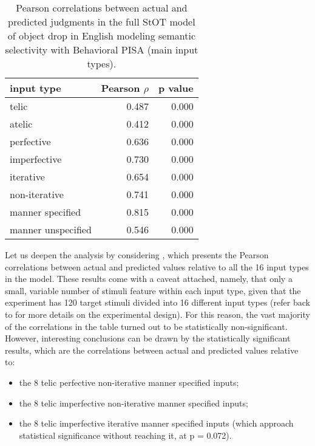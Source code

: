 \begin{table}[htb] %
\caption{Pearson correlations between actual and predicted judgments in the full StOT model of object drop in English modeling semantic selectivity with Behavioral PISA (main input types).}
\begin{tabular}{l|rr}
\textbf{input type} & \textbf{Pearson $\rho$} & \textbf{p value} \\
\hline
telic               & 0.487 & 0.000 \\
atelic              & 0.412 & 0.000 \\
perfective          & 0.636 & 0.000 \\
imperfective        & 0.730 & 0.000 \\
iterative           & 0.654 & 0.000 \\
non-iterative       & 0.741 & 0.000 \\
manner specified    & 0.815 & 0.000 \\
manner unspecified  & 0.546 & 0.000
\end{tabular}
\end{table}

Let us deepen the analysis by considering , which presents the Pearson correlations between actual and predicted values relative to all the 16 input types in the model. These results come with a caveat attached, namely, that only a small, variable number of stimuli feature within each input type, given that the experiment has 120 target stimuli divided into 16 different input types (refer back to  for more details on the experimental design). For this reason, the vast majority of the correlations in the table turned out to be statistically non-significant.\\
However, interesting conclusions can be drawn by the statistically significant results, which are the correlations between actual and predicted values relative to:

\begin{itemize}
    \item the 8 telic perfective non-iterative manner specified inputs;
    \item the 8 telic imperfective non-iterative manner specified inputs;
    \item the 8 telic imperfective iterative manner specified inputs (which approach statistical significance without reaching it, at p = 0.072).
\end{itemize}

